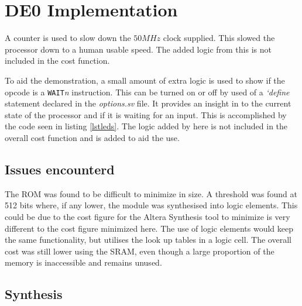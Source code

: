 
\section{DE0 Implementation}\label{sect:de0}



A counter is used to slow down the $50MHz$ clock supplied.%
This slowed the processor down to a human usable speed.
The added logic from this is not included in the cost function.


To aid the demonstration, a small amount of extra logic is used to show if the opcode is a \texttt{WAIT}\textit{n} instruction. 
This can be turned on or off by used of a \textit{`define} statement declared in the \textit{options.sv} file.
It provides an insight in to the current state of the processor and if it is waiting for an input.
This is accomplished by the code seen in listing \ref{lstleds}.
	The logic added by here is not included in the overall cost function and is added to aid the use. 




\subsection{Issues encounterd}

The ROM was found to be difficult to minimize in size. 
A threshold was found at 512 bits where, if any lower, the module was synthesised into logic elements. 
This could be due to the cost figure for the Altera Synthesis tool to minimize is very different to the cost figure minimized here. 
The use of logic elements would keep the same functionality, but utilises the look up tables in a logic cell. 
The overall cost was still lower using the SRAM, even though a large proportion of the memory is inaccessible and remains unused.

\subsection{Synthesis}

